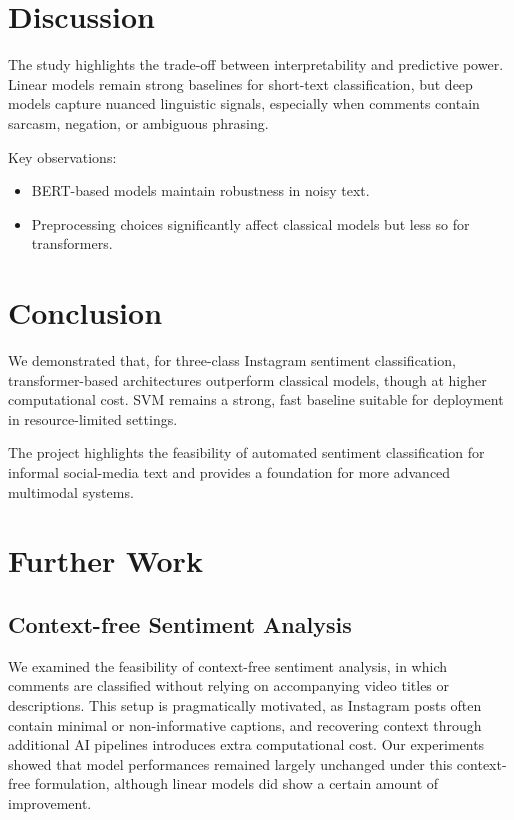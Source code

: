 \documentclass[11pt,a4paper]{article}
\begin{document}
\section{Discussion}
The study highlights the trade-off between interpretability and predictive power. Linear models remain strong baselines for short-text classification, but deep models capture nuanced linguistic signals, especially when comments contain sarcasm, negation, or ambiguous phrasing.

Key observations:
\begin{itemize}
    \item BERT-based models maintain robustness in noisy text.
    \item Preprocessing choices significantly affect classical models but less so for transformers.
\end{itemize}


\section{Conclusion}
We demonstrated that, for three-class Instagram sentiment classification, transformer-based architectures outperform classical models, though at higher computational cost. SVM remains a strong, fast baseline suitable for deployment in resource-limited settings.

The project highlights the feasibility of automated sentiment classification for informal social-media text and provides a foundation for more advanced multimodal systems.


\section{Further Work}
\subsection{Context-free Sentiment Analysis}
We examined the feasibility of context-free sentiment analysis, in which comments are classified without relying on accompanying video titles or descriptions. This setup is pragmatically motivated, as Instagram posts often contain minimal or non-informative captions, and recovering context through additional AI pipelines introduces extra computational cost. Our experiments showed that model performances remained largely unchanged under this context-free formulation, although linear models did show a certain amount of improvement.
\end{document}
